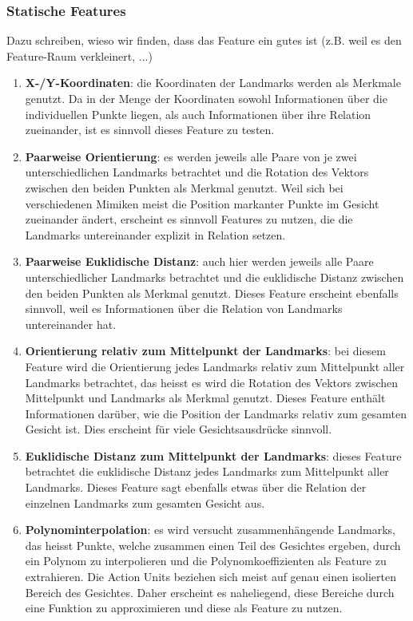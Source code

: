 \subsubsection{Statische Features}
Dazu schreiben, wieso wir finden, dass das Feature ein gutes ist (z.B. weil es den Feature-Raum verkleinert, ...)
\begin{enumerate}
  \item \textbf{X-/Y-Koordinaten}: die Koordinaten der Landmarks werden als Merkmale genutzt. Da in der Menge der Koordinaten sowohl Informationen
        über die individuellen Punkte liegen, als auch Informationen über ihre Relation zueinander, ist es sinnvoll dieses Feature zu testen.

  \item \textbf{Paarweise Orientierung}: es werden jeweils alle Paare von je zwei unterschiedlichen Landmarks betrachtet und die Rotation des Vektors zwischen
        den beiden Punkten als Merkmal genutzt. Weil sich bei verschiedenen Mimiken meist die Position markanter Punkte im Gesicht zueinander ändert, erscheint es sinnvoll
        Features zu nutzen, die die Landmarks untereinander explizit in Relation setzen.

  \item \textbf{Paarweise Euklidische Distanz}: auch hier werden jeweils alle Paare unterschiedlicher Landmarks betrachtet und die euklidische Distanz zwischen
        den beiden Punkten als Merkmal genutzt. Dieses Feature erscheint ebenfalls sinnvoll, weil es Informationen über die Relation von Landmarks untereinander hat.

  \item \textbf{Orientierung relativ zum Mittelpunkt der Landmarks}: bei diesem Feature wird die Orientierung jedes Landmarks relativ zum Mittelpunkt aller Landmarks betrachtet,
        das heisst es wird die Rotation des Vektors zwischen Mittelpunkt und Landmarks als Merkmal genutzt. Dieses Feature enthält Informationen darüber, wie die Position der Landmarks relativ
        zum gesamten Gesicht ist. Dies erscheint für viele Gesichtsausdrücke sinnvoll.

  \item \textbf{Euklidische Distanz zum Mittelpunkt der Landmarks}: dieses Feature betrachtet die euklidische Distanz jedes Landmarks zum Mittelpunkt aller Landmarks. Dieses Feature sagt ebenfalls
        etwas über die Relation der einzelnen Landmarks zum gesamten Gesicht aus.

  \item \textbf{Polynominterpolation}: es wird versucht zusammenhängende Landmarks, das heisst Punkte, welche zusammen einen Teil des Gesichtes ergeben,
        durch ein Polynom zu interpolieren und die Polynomkoeffizienten als Feature zu extrahieren. Die Action Units beziehen sich meist auf genau einen isolierten
        Bereich des Gesichtes. Daher erscheint es naheliegend, diese Bereiche durch eine Funktion zu approximieren und diese als Feature zu nutzen.
\end{enumerate}


